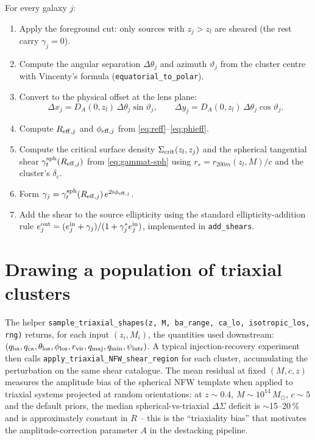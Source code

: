 \documentclass[11pt,a4paper]{article}
\newcommand{\DS}{\Delta\Sigma}
\newcommand{\Msun}{\,M_{\odot}}
\begin{document}
For every galaxy $j$:
\begin{enumerate}
\item Apply the foreground cut: only sources with $z_j > z_l$ are
      sheared (the rest carry $\gamma_j = 0$).
\item Compute the angular separation $\Delta\theta_j$ and azimuth
      $\vartheta_j$ from the cluster centre with Vincenty's formula
      (\texttt{equatorial\_to\_polar}).
\item Convert to the physical offset at the lens plane:
\begin{equation}
\Delta x_j = D_A(0, z_l)\,\Delta\theta_j\sin\vartheta_j,\qquad
\Delta y_j = D_A(0, z_l)\,\Delta\theta_j\cos\vartheta_j.
\end{equation}
\item Compute $R_{{\rm eff},j}$ and $\phi_{{\rm eff},j}$ from
      \eqref{eq:reff}--\eqref{eq:phieff}.
\item Compute the critical surface density
      $\Sigma_{\rm crit}(z_l, z_j)$ and the spherical tangential shear
      $\gamma_t^{\rm sph}(R_{{\rm eff},j})$ from \eqref{eq:gammat-sph} using
      $r_s = r_{200m}(z_l, M)/c$ and the cluster's $\delta_c$.
\item Form $\gamma_j = \gamma_t^{\rm sph}(R_{{\rm eff},j})\,e^{2 i \phi_{{\rm eff},j}}$.
\item Add the shear to the source ellipticity using the standard
      ellipticity-addition rule
      $e^{\rm out}_j = (e^{\rm in}_j + \gamma_j)/(1 + \gamma_j^* e^{\rm in}_j)$,
      implemented in \texttt{add\_shears}.
\end{enumerate}

\section{Drawing a population of triaxial clusters}

The helper \texttt{sample\_triaxial\_shapes(z, M, ba\_range, ca\_lo,
isotropic\_los, rng)} returns, for each input $(z_i, M_i)$, the
quantities used downstream:
$(q_{\rm ba}, q_{\rm ca}, \theta_{\rm los}, \phi_{\rm los},
r_{\rm vir}, q_{\rm maj}, q_{\rm min}, \psi_{\rm intr})$.
A typical injection-recovery experiment then calls
\texttt{apply\_triaxial\_NFW\_shear\_region} for each cluster, accumulating
the perturbation on the same shear catalogue. The mean residual at fixed
$(M, c, z)$ measures the amplitude bias of the spherical NFW
template when applied to triaxial systems projected at random
orientations: at $z\!\sim\!0.4$, $M\!\sim\!10^{14}\Msun$, $c\!\sim\!5$
and the default priors, the median spherical-vs-triaxial $\DS$ deficit
is $\sim$15--20\,\% and is approximately constant in $R$ -- this is the
``triaxiality bias'' that motivates the amplitude-correction parameter
$A$ in the destacking pipeline.
\end{document}
